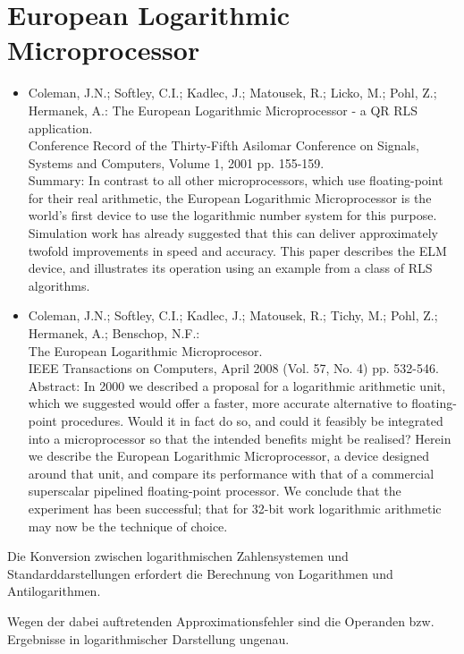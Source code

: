 \documentclass[10pt]{article}
\begin{document}
\section*{European Logarithmic Microprocessor}
\begin{itemize}
  \item Coleman, J.N.; Softley, C.I.; Kadlec, J.; Matousek, R.; Licko, M.; Pohl, Z.; Hermanek, A.: The European Logarithmic Microprocessor - a QR RLS application.\\
Conference Record of the Thirty-Fifth Asilomar Conference on Signals, Systems and Computers, Volume 1, 2001 pp. 155-159.\\
Summary: In contrast to all other microprocessors, which use floating-point for their real arithmetic, the European Logarithmic Microprocessor is the world's first device to use the logarithmic number system for this purpose. Simulation work has already suggested that this can deliver approximately twofold improvements in speed and accuracy. This paper describes the ELM device, and illustrates its operation using an example from a class of RLS algorithms.
  \item Coleman, J.N.; Softley, C.I.; Kadlec, J.; Matousek, R.; Tichy, M.; Pohl, Z.; Hermanek, A.; Benschop, N.F.:\\
The European Logarithmic Microprocesor.\\
IEEE Transactions on Computers, April 2008 (Vol. 57, No. 4) pp. 532-546.\\
Abstract: In 2000 we described a proposal for a logarithmic arithmetic unit, which we suggested would offer a faster, more accurate alternative to floating-point procedures. Would it in fact do so, and could it feasibly be integrated into a microprocessor so that the intended benefits might be realised? Herein we describe the European Logarithmic Microprocessor, a device designed around that unit, and compare its performance with that of a commercial superscalar pipelined floating-point processor. We conclude that the experiment has been successful; that for 32-bit work logarithmic arithmetic may now be the technique of choice.
\end{itemize}

Die Konversion zwischen logarithmischen Zahlensystemen und Standarddarstellungen erfordert die Berechnung von Logarithmen und Antilogarithmen.

Wegen der dabei auftretenden Approximationsfehler sind die Operanden bzw. Ergebnisse in logarithmischer Darstellung ungenau.
\end{document}
